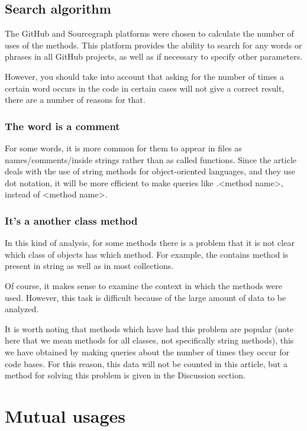 \documentclass[anonymous,sigplan,review,11pt,nonacm,natbib=false]{acmart}
\begin{document}
    \subsection{Search algorithm}

    The GitHub and Sourcegraph platforms were chosen to calculate the number of uses of the methods. This platform provides the ability to search for any words or phrases in all GitHub projects, as well as if necessary to specify other parameters.

    However, you should take into account that asking for the number of times a certain word occurs in the code in certain cases will not give a correct result, there are a number of reasons for that.

    \subsubsection{The word is a comment} \hl{}

    For some words, it is more common for them to appear in files as names/comments/inside strings rather than as called functions. Since the article deals with the use of string methods for object-oriented languages, and they use dot notation, it will be more efficient to make queries like .<method name>, instead of <method name>.

    \subsubsection{It's a another class method} \hl{}

    In this kind of analysis, for some methods there is a problem that it is not clear which class of objects has which method. For example, the contains method is present in string as well as in most collections.

    Of course, it makes sense to examine the context in which the methods were used. However, this task is difficult because of the large amount of data to be analyzed.

    It is worth noting that methods which have had this problem are popular (note here that we mean methods for all classes, not specifically string methods), this we have obtained by making queries about the number of times they occur for code bases. For this reason, this data will not be counted in this article, but a method for solving this problem is given in the Discussion section.

    \section{Mutual usages}
\end{document}
